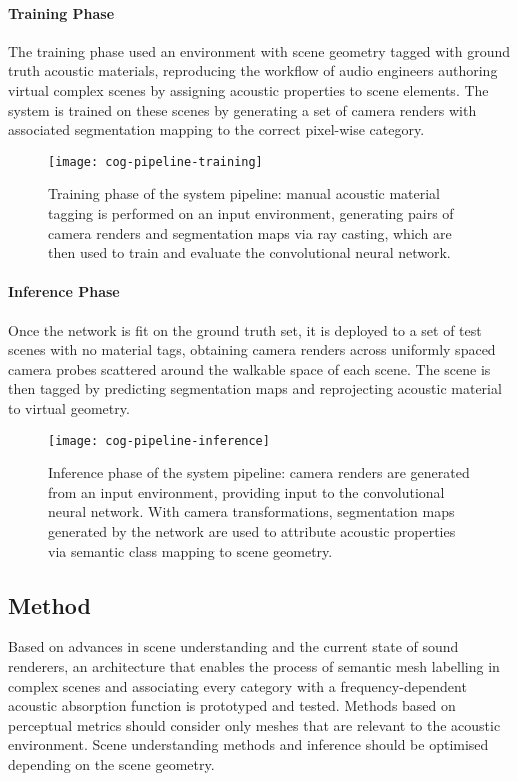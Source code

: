 \paragraph{Training Phase}
The training phase used an environment with scene geometry tagged with ground truth acoustic materials, reproducing the workflow of audio engineers authoring virtual complex scenes by assigning acoustic properties to scene elements. The system is trained on these scenes by generating a set of camera renders with associated segmentation mapping to the correct pixel-wise category.
\begin{figure}[htbp]
    \centering
    \texttt{[image: cog-pipeline-training]}
    \caption[Camera-based acoustic material tagging training]{Training phase of the system pipeline: manual acoustic material tagging is performed on an input environment, generating pairs of camera renders and segmentation maps via ray casting, which are then used to train and evaluate the convolutional neural network.}
    \label{fig:cog-training}
\end{figure}

\paragraph{Inference Phase}
Once the network is fit on the ground truth set, it is deployed to a set of test scenes with no material tags, obtaining camera renders across uniformly spaced camera probes scattered around the walkable space of each scene. The scene is then tagged by predicting segmentation maps and reprojecting acoustic material to virtual geometry.
\begin{figure}[htbp]
    \centering
    \texttt{[image: cog-pipeline-inference]}
    \caption[Camera-based acoustic material tagging inferece]{Inference phase of the system pipeline: camera renders are generated from an input environment, providing input to the convolutional neural network. With camera transformations, segmentation maps generated by the network are used to attribute acoustic properties via semantic class mapping to scene geometry.}
    \label{fig:cog-inference}
\end{figure}

\subsection{Method}\label{sec:mat-method}
Based on advances in scene understanding and the current state of sound renderers, an architecture that enables the process of semantic mesh labelling in complex scenes and associating every category with a frequency-dependent acoustic absorption function is prototyped and tested. Methods based on perceptual metrics should consider only meshes that are relevant to the acoustic environment. Scene understanding methods and inference should be optimised depending on the scene geometry.

